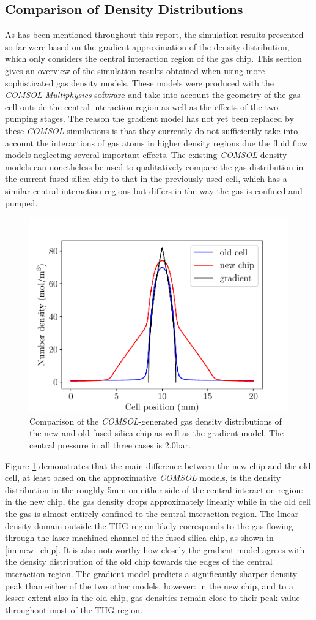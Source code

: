 \documentclass[a4paper]{jpconf}
\begin{document}
\subsection{Comparison of Density Distributions}
As has been mentioned throughout this report, the simulation results presented so far were based on the gradient approximation of the density distribution, which only considers the central interaction region of the gas chip. This section gives an overview of the simulation results obtained when using more sophisticated gas density models. These models were produced with the \textit{COMSOL Multiphysics} software and take into account the geometry of the gas cell outside the central interaction region as well as the effects of the two pumping stages. The reason the gradient model has not yet been replaced by these \textit{COMSOL} simulations is that they currently do not sufficiently take into account the interactions of gas atoms in higher density regions due the fluid flow models neglecting several important effects. The existing \textit{COMSOL} density models can nonetheless be used to qualitatively compare the gas distribution in the current fused silica chip to that in the previously used cell, which has a similar central interaction regions but differs in the way the gas is confined and pumped. \par 
\begin{figure}[h]
\centering
\includegraphics[width=0.5 \textwidth]{im/old_new_comp}
\caption{Comparison of the \textit{COMSOL}-generated gas density distributions of the new and old fused silica chip as well as the gradient model. The central pressure in all three cases is 2.0bar.}\label{im:dens}
\end{figure}
Figure \ref{im:dens} demonstrates that the main difference between the new chip and the old cell, at least based on the approximative \textit{COMSOL} models, is the density distribution in the roughly 5mm on either side of the central interaction region: in the new chip, the gas density drops approximately linearly while in the old cell the gas is almost entirely confined to the central interaction region. The linear density domain outside the THG region likely corresponds to the gas flowing through the laser machined channel of the fused silica chip, as shown in \ref{im:new_chip}. It is also noteworthy how closely the gradient model agrees with the density distribution of the old chip towards the edges of the central interaction region. The gradient model predicts a significantly sharper density peak than either of the two other models, however: in the new chip, and to a lesser extent also in the old chip, gas densities remain close to their peak value throughout most of the THG region. \par 
\end{document}
